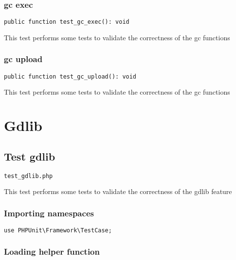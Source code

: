 \documentclass[a4paper]{article}
\begin{document}
\hypertarget{toc206}{}
\subsubsection{gc exec}

\begin{lstlisting}
public function test_gc_exec(): void
\end{lstlisting}

This test performs some tests to validate the correctness
of the gc functions

\hypertarget{toc207}{}
\subsubsection{gc upload}

\begin{lstlisting}
public function test_gc_upload(): void
\end{lstlisting}

This test performs some tests to validate the correctness
of the gc functions


\hypertarget{toc208}{}
\section{Gdlib}

\hypertarget{toc209}{}
\subsection{Test gdlib}

\begin{lstlisting}
test_gdlib.php
\end{lstlisting}

This test performs some tests to validate the correctness
of the gdlib feature

\hypertarget{toc210}{}
\subsubsection{Importing namespaces}

\begin{lstlisting}
use PHPUnit\Framework\TestCase;
\end{lstlisting}

\hypertarget{toc211}{}
\subsubsection{Loading helper function}
\end{document}
